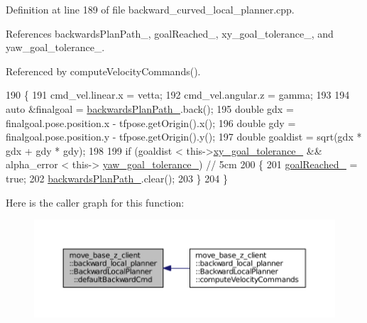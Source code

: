 Definition at line 189 of file backward\+\_\+curved\+\_\+local\+\_\+planner.\+cpp.



References backwards\+Plan\+Path\+\_\+, goal\+Reached\+\_\+, xy\+\_\+goal\+\_\+tolerance\+\_\+, and yaw\+\_\+goal\+\_\+tolerance\+\_\+.



Referenced by compute\+Velocity\+Commands().


\begin{DoxyCode}
190 \{
191     cmd\_vel.linear.x = vetta;
192     cmd\_vel.angular.z = gamma;
193 
194     \textcolor{keyword}{auto} &finalgoal = \hyperlink{classmove__base__z__client_1_1backward__local__planner_1_1BackwardLocalPlanner_a451add2af7d6d83a7415277311b3ed04}{backwardsPlanPath\_}.back();
195     \textcolor{keywordtype}{double} gdx = finalgoal.pose.position.x - tfpose.getOrigin().x();
196     \textcolor{keywordtype}{double} gdy = finalgoal.pose.position.y - tfpose.getOrigin().y();
197     \textcolor{keywordtype}{double} goaldist = sqrt(gdx * gdx + gdy * gdy);
198 
199     \textcolor{keywordflow}{if} (goaldist < this->\hyperlink{classmove__base__z__client_1_1backward__local__planner_1_1BackwardLocalPlanner_a89ab1ee7283a474dc19970789f51c087}{xy\_goal\_tolerance\_} && alpha\_error < this->
      \hyperlink{classmove__base__z__client_1_1backward__local__planner_1_1BackwardLocalPlanner_a10d15842054d518159baa535afe6f1fd}{yaw\_goal\_tolerance\_}) \textcolor{comment}{// 5cm}
200     \{
201         \hyperlink{classmove__base__z__client_1_1backward__local__planner_1_1BackwardLocalPlanner_a0a89141d3d3a8ebfb9e1d69d0d33fd49}{goalReached\_} = \textcolor{keyword}{true};
202         \hyperlink{classmove__base__z__client_1_1backward__local__planner_1_1BackwardLocalPlanner_a451add2af7d6d83a7415277311b3ed04}{backwardsPlanPath\_}.clear();
203     \}
204 \}
\end{DoxyCode}


Here is the caller graph for this function\+:
\nopagebreak
\begin{figure}[H]
\begin{center}
\leavevmode
\includegraphics[width=350pt]{classmove__base__z__client_1_1backward__local__planner_1_1BackwardLocalPlanner_a9f3977494d5f80884eb1a1d09b5b4673_icgraph}
\end{center}
\end{figure}


